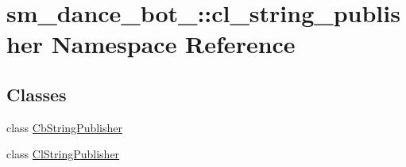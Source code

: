 \hypertarget{namespacesm__dance__bot__3_1_1cl__string__publisher}{}\section{sm\+\_\+dance\+\_\+bot\+\_\+:\+:cl\+\_\+string\+\_\+publisher Namespace Reference}
\label{namespacesm__dance__bot__3_1_1cl__string__publisher}
\subsection*{Classes}
\begin{DoxyCompactItemize}
\item 
class \hyperlink{classsm__dance__bot__3_1_1cl__string__publisher_1_1CbStringPublisher}{Cb\+String\+Publisher}
\item 
class \hyperlink{classsm__dance__bot__3_1_1cl__string__publisher_1_1ClStringPublisher}{Cl\+String\+Publisher}
\end{DoxyCompactItemize}
